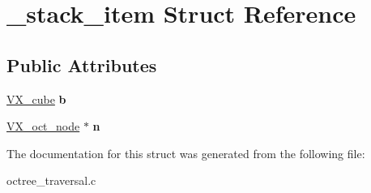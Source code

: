\hypertarget{struct__stack__item}{\section{\-\_\-stack\-\_\-item Struct Reference}
\label{struct__stack__item}
}
\subsection*{Public Attributes}
\begin{DoxyCompactItemize}
\item 
\hypertarget{struct__stack__item_a0930b259945a1e32df31b013348b620f}{\hyperlink{structVX__cube}{V\-X\-\_\-cube} {\bfseries b}}\label{struct__stack__item_a0930b259945a1e32df31b013348b620f}

\item 
\hypertarget{struct__stack__item_ada455fbfb5896746609d076edb8d43f0}{\hyperlink{structVX__oct__node}{V\-X\-\_\-oct\-\_\-node} $\ast$ {\bfseries n}}\label{struct__stack__item_ada455fbfb5896746609d076edb8d43f0}

\end{DoxyCompactItemize}


The documentation for this struct was generated from the following file\-:\begin{DoxyCompactItemize}
\item 
octree\-\_\-traversal.\-c\end{DoxyCompactItemize}
